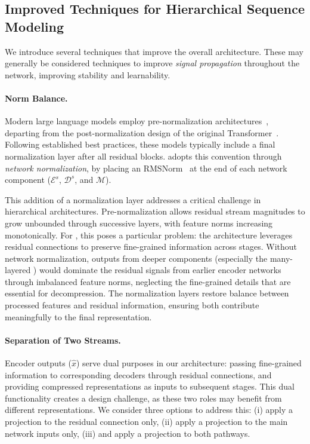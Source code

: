 \subsection{Improved Techniques for Hierarchical Sequence Modeling}
\label{sec: Improved-Techniques}

We introduce several techniques that improve the overall architecture.
These may generally be considered techniques to improve \emph{signal propagation} throughout the network, improving stability and learnability.

\paragraph{Norm Balance.}
Modern large language models employ pre-normalization architectures~\citep{GPT2, Llama}, departing from the post-normalization design of the original Transformer~\citep{Transformer}.
Following established best practices, these models typically include a final normalization layer after all residual blocks.
\model{} adopts this convention through \emph{network normalization}, by placing an RMSNorm~\citep{RMSNorm} at the end of each network component ($\mathcal{E}^s$, $\mathcal{D}^s$, and $\mathcal{M}$).

This addition of a normalization layer addresses a critical challenge in hierarchical architectures.
Pre-normalization allows residual stream magnitudes to grow unbounded through successive layers, with feature norms increasing monotonically.
For \model{}, this poses a particular problem: the architecture leverages residual connections to preserve fine-grained information across stages.
Without network normalization, outputs from deeper components (especially the many-layered \main{}) would dominate the residual signals from earlier encoder networks through imbalanced feature norms, neglecting the fine-grained details that are essential for decompression.
The normalization layers restore balance between processed features and residual information, ensuring both contribute meaningfully to the final representation.

\paragraph{Separation of Two Streams.}
Encoder outputs ($\hat{x}$) serve dual purposes in our architecture: passing fine-grained information to corresponding decoders through residual connections, and providing compressed representations as inputs to subsequent stages.
This dual functionality creates a design challenge, as these two roles may benefit from different representations.
We consider three options to address this: (i) apply a projection to the residual connection only, (ii) apply a projection to the main network inputs only, (iii) and apply a projection to both pathways.

